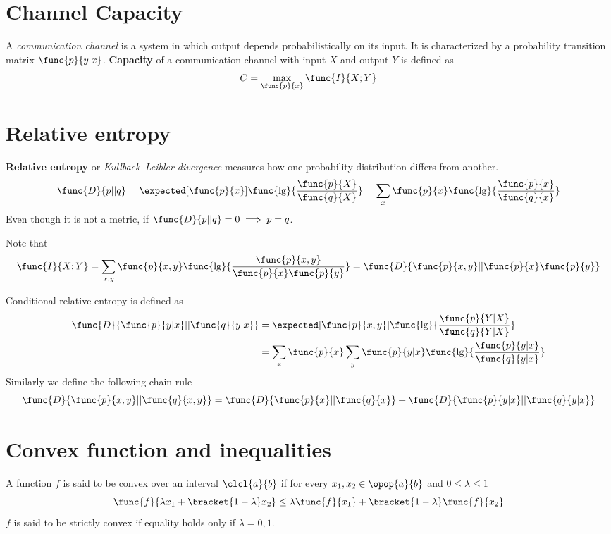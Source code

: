 \section{Channel Capacity}
A \textit{communication channel} is a system in which output depends probabilistically on its input. It is characterized by a probability transition matrix \(\func{p}{y|x}\). \textbf{Capacity} of a communication channel with input \(X\) and output \(Y\) is defined as 
\begin{equation*}
      C = \max_{\func{p}{x}} \func{I}{X;Y}
\end{equation*}

\section{Relative entropy}
\textbf{Relative entropy} or  \textit{Kullback–Leibler divergence} measures how one probability distribution differs from another. 
\begin{equation*}
      \func{D}{p || q}= \expected[\func{p}{x}]{\func{\lg}{\frac{\func{p}{X}}{\func{q}{X}}}} = \sum_{x} \func{p}{x} \func{\lg}{\frac{\func{p}{x}}{\func{q}{x}}}
\end{equation*}
Even though it is not a metric, if \(\func{D}{p || q} = 0 \implies p = q\).

Note that 
\begin{equation*}
      \func{I}{X;Y} = \sum_{x,y} \func{p}{x,y} \func{\lg}{\frac{\func{p}{x,y}}{\func{p}{x} \func{p}{y}}} = \func{D}{\func{p}{x,y} || \func{p}{x} \func{p}{y}}
\end{equation*}

Conditional relative entropy is defined as 
\begin{align*}
      \func{D}{ \func{p}{y|x} || \func{q}{y|x} } &= \expected[\func{p}{x,y}]{\func{\lg}{\frac{\func{p}{Y|X}}{\func{q}{Y|X}}}}\\
      &= \sum_{x} \func{p}{x} \sum_{y} \func{p}{y|x} \func{\lg}{\frac{\func{p}{y|x}}{\func{q}{y|x}}}
\end{align*}
Similarly we define the following chain rule 
\begin{equation*}
      \func{D}{ \func{p}{x,y} || \func{q}{x,y} } = \func{D}{ \func{p}{x} || \func{q}{x} } + \func{D}{ \func{p}{y|x} || \func{q}{y|x} }
\end{equation*}

\section{Convex function and inequalities}
A function \(f\) is said to be convex over an interval \(\clcl{a}{b}\) if for every \(x_1,x_2 \in \opop{a}{b}\) and \(0 \leq \lambda \leq 1\)
\begin{equation*}
      \func{f}{\lambda x_1 + \bracket{1 - \lambda} x_2} \leq \lambda \func{f}{x_1} + \bracket{1 - \lambda} \func{f}{x_2}
\end{equation*}
\(f\) is said to be strictly convex if equality holds only if \(\lambda = 0,1\).

